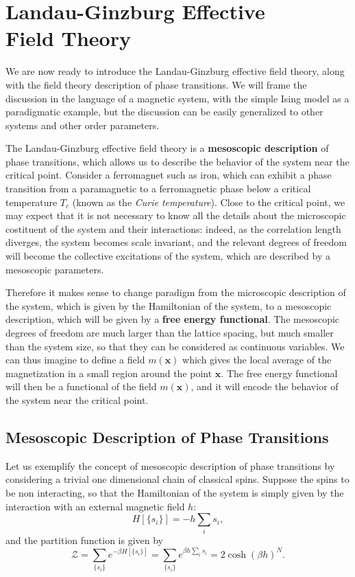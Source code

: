 \chapter[Landau-Ginzburg Effective Field Theory]{Landau-Ginzburg Effective \\Field Theory}

We are now ready to introduce the Landau-Ginzburg effective field theory, along with the field theory description of phase transitions. We will frame the discussion in the language of a magnetic system, with the simple Ising model as a paradigmatic example, but the discussion can be easily generalized to other systems and other order parameters.

The Landau-Ginzburg effective field theory is a \textbf{mesoscopic description} of phase transitions, which allows us to describe the behavior of the system near the critical point. Consider a ferromagnet such as iron, which can exhibit a phase transition from a paramagnetic to a ferromagnetic phase below a critical temperature $T_c$ (known as the \textit{Curie temperature}). Close to the critical point, we may expect that it is not necessary to know all the details about the microscopic costituent of the system and their interactions: indeed, as the correlation length diverges, the system becomes scale invariant, and the relevant degrees of freedom will become the collective excitations of the system, which are described by a mesoscopic parameters.

Therefore it makes sense to change paradigm from the microscopic description of the system, which is given by the Hamiltonian of the system, to a mesoscopic description, which will be given by a \textbf{free energy functional}. The mesoscopic degrees of freedom are much larger than the lattice spacing, but much smaller than the system size, so that they can be considered as continuous variables. We can thus imagine to define a field \(m(\mathbf{x})\) which gives the local average of the magnetization in a small region around the point \(\mathbf{x}\). The free energy functional will then be a functional of the field \(m(\mathbf{x})\), and it will encode the behavior of the system near the critical point.

\section{Mesoscopic Description of Phase Transitions}

Let us exemplify the concept of mesoscopic description of phase transitions by considering a trivial one dimensional chain of classical spins. Suppose the spins to be non interacting, so that the Hamiltonian of the system is simply given by the interaction with an external magnetic field \(h\):
\[
    H[\{s_i\}] = -h \sum_i s_i,
\]
and the partition function is given by
\[
    \mathcal{Z} = \sum_{\{s_i\}} e^{-\beta H[\{s_i\}]} = \sum_{\{s_i\}} e^{\beta h \sum_{i}  s_i} = {2 \cosh(\beta h)}^N.
\]

